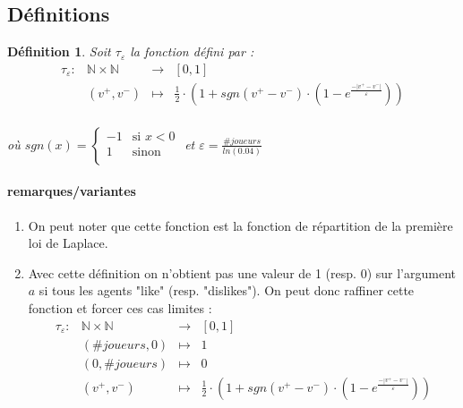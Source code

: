 \documentclass[12pt]{article}
\theoremstyle{defi}
\newtheorem{definition}{Définition}[section]
\theoremstyle{not}
\theoremstyle{prob}
\begin{document}
  \subsection{Définitions}
  \label{ref:def_tau}
  \color{blue}
      \begin{definition}
        Soit $\tau_\varepsilon$ la fonction défini par :
        $$\begin{array}{rclc}
          \tau_\varepsilon :  & \mathbb{N} \times \mathbb{N} & \longrightarrow & [0, 1] \\
          & (v^+,v^-) & \longmapsto & \frac{1}{2} \cdot \left(1 + sgn(v^+ - v^-) \cdot \left(1 - e^{\frac{-|v^+ - v^-|}{\varepsilon}}\right)\right)\\
        \end{array}$$

        où $sgn(x) = \left\{
        \begin{array}{ll}
          -1  & \mbox{si } x < 0 \\
          1 & \mbox{sinon} \\
        \end{array}
        \right.$ et $\varepsilon = \frac{\#joueurs}{ln(0.04)}$
      \end{definition}

      \paragraph{remarques/variantes}
        \begin{enumerate}
          \item On peut noter que cette fonction est la fonction de répartition de la première loi de Laplace.
          \item Avec cette définition on n'obtient pas une valeur de 1 (resp. $0$) sur l'argument $a$ si tous les agents "like" (resp. "dislikes"). On peut donc raffiner cette fonction et forcer ces cas limites :
          $$\begin{array}{rclc}
            \tau_\varepsilon :  & \mathbb{N} \times \mathbb{N} & \longrightarrow & [0, 1] \\
            & (\#joueurs, 0) & \longmapsto & 1 \\
            & (0, \#joueurs) & \longmapsto & 0 \\
            & (v^+,v^-) & \longmapsto & \frac{1}{2} \cdot \left(1 + sgn(v^+ - v^-) \cdot \left(1 - e^{\frac{-|v^+ - v^-|}{\varepsilon}}\right)\right)\\
          \end{array}$$
        \end{enumerate}
\end{document}
